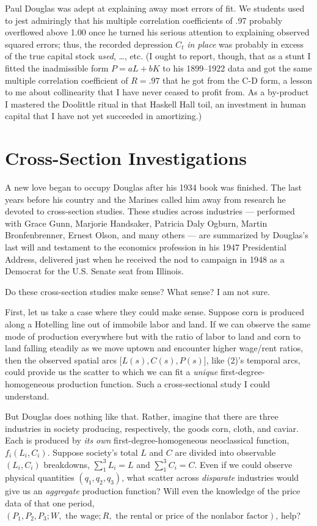 \documentclass{article}
\begin{document}
Paul Douglas was adept at explaining away most errors of fit. We students used to jest admiringly that his multiple correlation coefficients of .97 probably overflowed above 1.00 once he turned his serious attention to explaining observed squared errors; thus, the recorded depression \(C_t\) \emph{in place} was probably in excess of the true capital stock \emph{used}, …, etc. (I ought to report, though, that as a stunt I fitted the inadmissible form \(P=aL+bK\) to his 1899--1922 data and got the same multiple correlation coefficient of \(R = .97\) that he got from the C-D form, a lesson to me about collinearity that I have never ceased to profit from. As a by-product I mastered the Doolittle ritual in that Haskell Hall toil, an investment in human capital that I have not yet succeeded in amortizing.)

\section*{Cross-Section Investigations}

A new love began to occupy Douglas after his 1934 book was finished. The last years before his country and the Marines called him away from research he devoted to cross-section studies. These studies across industries --- performed with Grace Gunn, Marjorie Handsaker, %
Patricia Daly Ogburn, Martin Bronfenbrenner, Ernest Olson, and many others --- are summarized by Douglas's last will and testament to the economics profession in his 1947 Presidential Address, delivered just when he received the nod to campaign in 1948 as a Democrat for the U.S. Senate seat from Illinois.

Do these cross-section studies make sense? What sense? I am not sure.

First, let us take a case where they could make sense. Suppose corn is produced along a Hotelling line out of immobile labor and land. If we can observe the same mode of production everywhere but with the ratio of labor to land and corn to land falling steadily as we move uptown and encounter higher wage/rent ratios, then the observed spatial arcs \(\lbrack L(s),C(s),P(s) \rbrack\), like (2)'s temporal arcs, could provide us the scatter to which we can fit a \emph{unique} first-degree-homogeneous production function. Such a cross-sectional study I could understand.

But Douglas does nothing like that. Rather, imagine that there are three industries in society producing, respectively, the goods corn, cloth, and caviar. Each is produced by \emph{its own} first-degree-homogeneous neoclassical function, \(f_i (L_i,C_i )\). Suppose society's total \(L\) and \(C\) are divided into observable \((L_i,C_i )\) breakdowns, \(\sum_1^3 L_i =L\) and \(\sum_1^3 C_i =C\). Even if we could observe physical quantities \((q_1,q_2,q_3 )\), what scatter across \emph{disparate} industries would give us an \emph{aggregate} production function? Will even the knowledge of the price data of that one period, \((P_1,P_2,P_3;W,\text{ the wage}; R,\text{ the rental or price of the nonlabor factor})\), help?
\end{document}
